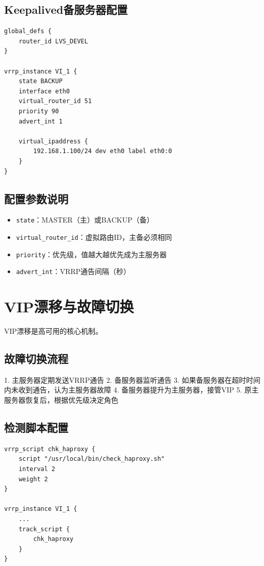 \documentclass[12pt,UTF8]{ctexbook}
\begin{document}
\subsection*{Keepalived备服务器配置}
\begin{lstlisting}
global_defs {
    router_id LVS_DEVEL
}

vrrp_instance VI_1 {
    state BACKUP
    interface eth0
    virtual_router_id 51
    priority 90
    advert_int 1
    
    virtual_ipaddress {
        192.168.1.100/24 dev eth0 label eth0:0
    }
}
\end{lstlisting}

\subsection*{配置参数说明}
\begin{itemize}
    \item \texttt{state}：MASTER（主）或BACKUP（备）
    \item \texttt{virtual\_router\_id}：虚拟路由ID，主备必须相同
    \item \texttt{priority}：优先级，值越大越优先成为主服务器
    \item \texttt{advert\_int}：VRRP通告间隔（秒）
\end{itemize}

\section{VIP漂移与故障切换}
\label{sec:vip-failover}

VIP漂移是高可用的核心机制。

\subsection*{故障切换流程}
1. 主服务器定期发送VRRP通告
2. 备服务器监听通告
3. 如果备服务器在超时时间内未收到通告，认为主服务器故障
4. 备服务器提升为主服务器，接管VIP
5. 原主服务器恢复后，根据优先级决定角色

\subsection*{检测脚本配置}
\begin{lstlisting}
vrrp_script chk_haproxy {
    script "/usr/local/bin/check_haproxy.sh"
    interval 2
    weight 2
}

vrrp_instance VI_1 {
    ...
    track_script {
        chk_haproxy
    }
}
\end{lstlisting}
\end{document}
